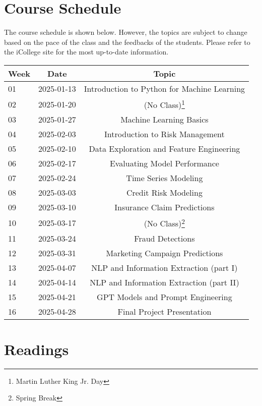 \documentclass[a4paper, 12pt]{article}
\begin{document}
\section{Course Schedule}
The course schedule is shown below. However, the topics are subject to change based on the pace of the class and the feedbacks of the students. Please refer to the iCollege site for the most up-to-date information.

\begin{center}
    \begin{tabular}{ l | c | c }
        \hline			
        Week & Date & Topic\\
        \hline
        01 & 2025-01-13 & Introduction to Python for Machine Learning\\
        02 & 2025-01-20 & (No Class)\footnote{Martin Luther King Jr. Day}\\
        03 & 2025-01-27 & Machine Learning Basics\\
        04 & 2025-02-03 & Introduction to Risk Management\\
        05 & 2025-02-10 & Data Exploration and Feature Engineering\\
        06 & 2025-02-17 & Evaluating Model Performance\\
        07 & 2025-02-24 & Time Series Modeling\\
        08 & 2025-03-03 & Credit Risk Modeling\\
        09 & 2025-03-10 & Insurance Claim Predictions\\
        10 & 2025-03-17 & (No Class)\footnote{Spring Break}\\
        11 & 2025-03-24 & Fraud Detections\\
        12 & 2025-03-31 & Marketing Campaign Predictions\\
        13 & 2025-04-07 & NLP and Information Extraction (part I)\\
        14 & 2025-04-14 & NLP and Information Extraction (part II)\\
        15 & 2025-04-21 & GPT Models and Prompt Engineering\\
        16 & 2025-04-28 & Final Project Presentation\\
        \hline  
    \end{tabular}
\end{center}

\section{Readings}
\end{document}
